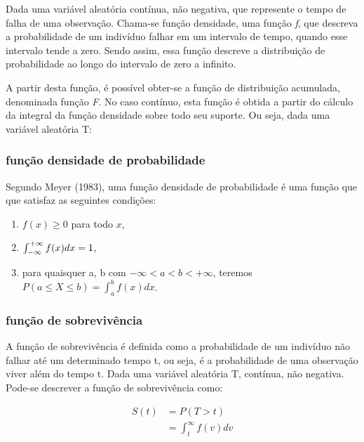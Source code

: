 \documentclass[a4paper,12pt]{article}
\begin{document}
Dada uma variável aleatória contínua, não negativa, que represente o tempo de falha de uma observação. Chama-se função densidade, uma função \textit{f}, que descreva a probabilidade de um indivíduo falhar em um intervalo de tempo, quando esse intervalo tende a zero. Sendo assim, essa função descreve a distribuição de probabilidade ao longo do intervalo de zero a infinito.

A partir desta função, é possível obter-se a função de distribuição acumulada, denominada função \textit{F}. No caso contínuo, esta função é obtida a partir do cálculo da integral da função densidade sobre todo seu suporte. Ou seja, dada uma variável aleatória T:

\subsubsection{função densidade de probabilidade}

Segundo Meyer (1983), uma função densidade de probabilidade é uma função que que satisfaz as seguintes condições:%

\begin{enumerate}

	\item $f(x) \ge 0$ para todo $x$,
	\item $\int_{\tiny{-\infty}}^{\tiny{+\infty}} f(x)dx = 1$,
	\item para quaisquer a, b com $-\infty < a < b < +\infty$, teremos $P(a \le X \le b) = \int_a^b f(x)dx$.
\end{enumerate}
	 
		
\subsubsection{função de sobrevivência}

A função de sobrevivência é definida como a probabilidade de um indivíduo não falhar até um determinado tempo t, ou seja, é a probabilidade de uma observação viver além do tempo t. Dada uma variável aleatória T, contínua, não negativa. Pode-se descrever a função de sobrevivência como:

\begin{equation} \label{eq:1}
	\begin{split}
		S(t) & = P(T > t) \\
		& = \int_t^{\infty} f(v)dv 
  	\end{split}
\end{equation} 
\end{document}

